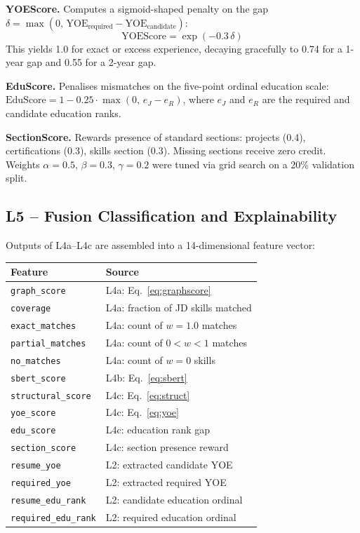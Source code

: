 \documentclass[conference]{IEEEtran}
\begin{document}
\noindent\textbf{YOEScore.} Computes a sigmoid-shaped penalty on the gap
$\delta = \max(0,\, \text{YOE}_{\text{required}} - \text{YOE}_{\text{candidate}})$:
\begin{equation}
  \text{YOEScore} = \exp(-0.3\,\delta)
  \label{eq:yoe}
\end{equation}
This yields 1.0 for exact or excess experience, decaying gracefully to 0.74
for a 1-year gap and 0.55 for a 2-year gap.

\noindent\textbf{EduScore.} Penalises mismatches on the five-point ordinal
education scale: $\text{EduScore} = 1 - 0.25 \cdot \max(0,\,e_J - e_R)$,
where $e_J$ and $e_R$ are the required and candidate education ranks.

\noindent\textbf{SectionScore.} Rewards presence of standard sections:
projects (0.4), certifications (0.3), skills section (0.3). Missing
sections receive zero credit. Weights $\alpha = 0.5$, $\beta = 0.3$,
$\gamma = 0.2$ were tuned via grid search on a 20\% validation split.

\subsection{L5 -- Fusion Classification and Explainability}

Outputs of L4a--L4c are assembled into a 14-dimensional feature vector:

\begin{center}
\footnotesize
\begin{tabular}{ll}
\toprule
\textbf{Feature} & \textbf{Source} \\
\midrule
\texttt{graph\_score}     & L4a: Eq.~\ref{eq:graphscore}        \\
\texttt{coverage}         & L4a: fraction of JD skills matched   \\
\texttt{exact\_matches}   & L4a: count of $w = 1.0$ matches      \\
\texttt{partial\_matches} & L4a: count of $0 < w < 1$ matches    \\
\texttt{no\_matches}      & L4a: count of $w = 0$ skills         \\
\texttt{sbert\_score}     & L4b: Eq.~\ref{eq:sbert}              \\
\texttt{structural\_score}& L4c: Eq.~\ref{eq:struct}             \\
\texttt{yoe\_score}       & L4c: Eq.~\ref{eq:yoe}                \\
\texttt{edu\_score}       & L4c: education rank gap              \\
\texttt{section\_score}   & L4c: section presence reward         \\
\texttt{resume\_yoe}      & L2: extracted candidate YOE          \\
\texttt{required\_yoe}    & L2: extracted required YOE           \\
\texttt{resume\_edu\_rank}& L2: candidate education ordinal      \\
\texttt{required\_edu\_rank} & L2: required education ordinal    \\
\bottomrule
\end{tabular}
\end{center}
\end{document}

